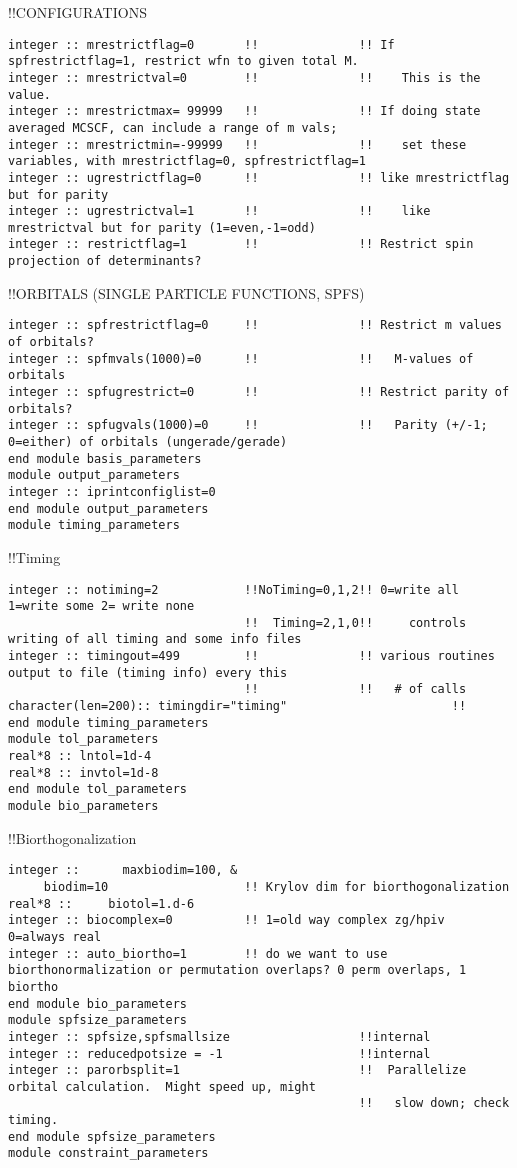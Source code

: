 !!{\large \quad CONFIGURATIONS}
\begin{verbatim}
integer :: mrestrictflag=0       !!              !! If spfrestrictflag=1, restrict wfn to given total M.
integer :: mrestrictval=0        !!              !!    This is the value.
integer :: mrestrictmax= 99999   !!              !! If doing state averaged MCSCF, can include a range of m vals;
integer :: mrestrictmin=-99999   !!              !!    set these variables, with mrestrictflag=0, spfrestrictflag=1
integer :: ugrestrictflag=0      !!              !! like mrestrictflag but for parity
integer :: ugrestrictval=1       !!              !!    like mrestrictval but for parity (1=even,-1=odd)
integer :: restrictflag=1        !!              !! Restrict spin projection of determinants?
\end{verbatim}
!!{\large \quad ORBITALS (SINGLE PARTICLE FUNCTIONS, SPFS)}
\begin{verbatim}
integer :: spfrestrictflag=0     !!              !! Restrict m values of orbitals?  
integer :: spfmvals(1000)=0      !!              !!   M-values of orbitals 
integer :: spfugrestrict=0       !!              !! Restrict parity of orbitals? 
integer :: spfugvals(1000)=0     !!              !!   Parity (+/-1; 0=either) of orbitals (ungerade/gerade)
end module basis_parameters
module output_parameters
integer :: iprintconfiglist=0
end module output_parameters
module timing_parameters
\end{verbatim}
!!{\large \quad Timing}
\begin{verbatim}
integer :: notiming=2            !!NoTiming=0,1,2!! 0=write all 1=write some 2= write none
                                 !!  Timing=2,1,0!!     controls writing of all timing and some info files
integer :: timingout=499         !!              !! various routines output to file (timing info) every this 
                                 !!              !!   # of calls
character(len=200):: timingdir="timing"                       !!
end module timing_parameters
module tol_parameters
real*8 :: lntol=1d-4
real*8 :: invtol=1d-8
end module tol_parameters
module bio_parameters
\end{verbatim}
!!{\large \quad Biorthogonalization }
\begin{verbatim}
integer ::      maxbiodim=100, &
     biodim=10                   !! Krylov dim for biorthogonalization
real*8 ::     biotol=1.d-6
integer :: biocomplex=0          !! 1=old way complex zg/hpiv  0=always real
integer :: auto_biortho=1        !! do we want to use biorthonormalization or permutation overlaps? 0 perm overlaps, 1 biortho
end module bio_parameters
module spfsize_parameters
integer :: spfsize,spfsmallsize                  !!internal
integer :: reducedpotsize = -1                   !!internal
integer :: parorbsplit=1                         !!  Parallelize orbital calculation.  Might speed up, might
                                                 !!   slow down; check timing.
end module spfsize_parameters
module constraint_parameters
\end{verbatim}
